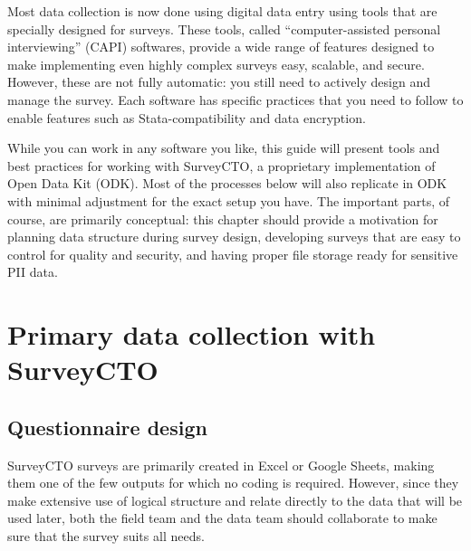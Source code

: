 
\begin{fullwidth}
Most data collection is now done using digital data entry
using tools that are specially designed for surveys.
These tools, called ``computer-assisted personal interviewing'' (CAPI) softwares,
provide a wide range of features designed to make
implementing even highly complex surveys easy, scalable, and secure.
However, these are not fully automatic:
you still need to actively design and manage the survey.
Each software has specific practices that you need to follow
to enable features such as Stata-compatibility and data encryption.

While you can work in any software you like,
this guide will present tools and best practices
for working with SurveyCTO, a proprietary implementation of Open Data Kit (ODK).
Most of the processes below will also replicate in ODK
with minimal adjustment for the exact setup you have.
The important parts, of course, are primarily conceptual:
this chapter should provide a motivation for
planning data structure during survey design,
developing surveys that are easy to control for quality and security,
and having proper file storage ready for sensitive PII data.
\end{fullwidth}


\section{Primary data collection with SurveyCTO}

\subsection{Questionnaire design}

SurveyCTO surveys are primarily created in Excel or Google Sheets,
making them one of the few outputs for which no coding is required.
However, since they make extensive use of logical structure and
relate directly to the data that will be used later,
both the field team and the data team should
collaborate to make sure that the survey suits all needs.\cite{krosnick2018questionnaire}

